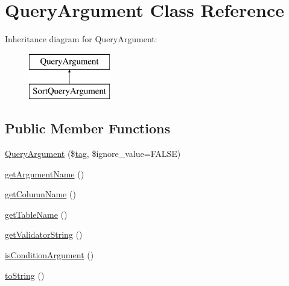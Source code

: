 \hypertarget{classQueryArgument}{}\section{Query\+Argument Class Reference}
\label{classQueryArgument}
Inheritance diagram for Query\+Argument\+:\begin{figure}[H]
\begin{center}
\leavevmode
\includegraphics[height=2.000000cm]{classQueryArgument}
\end{center}
\end{figure}
\subsection*{Public Member Functions}
\begin{DoxyCompactItemize}
\item 
\hyperlink{classQueryArgument_afea147e5e68498289eb0b70a4ff18501}{Query\+Argument} (\$\hyperlink{classtag}{tag}, \$ignore\+\_\+value=F\+A\+L\+SE)
\item 
\hyperlink{classQueryArgument_a01a5627882c4034551e0c22daed811bd}{get\+Argument\+Name} ()
\item 
\hyperlink{classQueryArgument_aa0ee6b3b56a5c9de48fe073f84f818bc}{get\+Column\+Name} ()
\item 
\hyperlink{classQueryArgument_a0cd81646f06d0b3d8ed92977498fd7aa}{get\+Table\+Name} ()
\item 
\hyperlink{classQueryArgument_a457e607f0cc0ec072e00f0bc5c3898fd}{get\+Validator\+String} ()
\item 
\hyperlink{classQueryArgument_af45c774e9b260c62bfa0a4a9e8e5b10d}{is\+Condition\+Argument} ()
\item 
\hyperlink{classQueryArgument_a659504bbccf960ab47afeac6c4e7a30a}{to\+String} ()
\end{DoxyCompactItemize}
